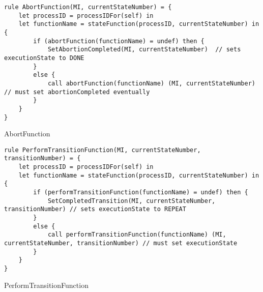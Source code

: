 \begin{listing}[H]
\begin{verbatim}
rule AbortFunction(MI, currentStateNumber) = {
    let processID = processIDFor(self) in
    let functionName = stateFunction(processID, currentStateNumber) in {
        if (abortFunction(functionName) = undef) then {
            SetAbortionCompleted(MI, currentStateNumber)  // sets executionState to DONE
        }
        else {
            call abortFunction(functionName) (MI, currentStateNumber) // must set abortionCompleted eventually
        }
    }
}
\end{verbatim}
\caption{AbortFunction}
\label{lst:asm:AbortFunction}
\end{listing}




\begin{listing}[H]
\begin{verbatim}
rule PerformTransitionFunction(MI, currentStateNumber, transitionNumber) = {
    let processID = processIDFor(self) in
    let functionName = stateFunction(processID, currentStateNumber) in {
        if (performTransitionFunction(functionName) = undef) then {
            SetCompletedTransition(MI, currentStateNumber, transitionNumber) // sets executionState to REPEAT
        }
        else {
            call performTransitionFunction(functionName) (MI, currentStateNumber, transitionNumber) // must set executionState
        }
    }
}
\end{verbatim}
\caption{PerformTransitionFunction}
\label{lst:asm:PerformTransitionFunction}
\end{listing}




